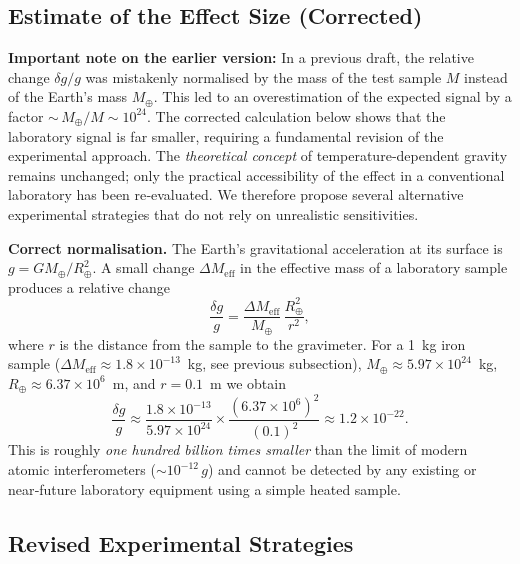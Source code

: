 \documentclass[12pt]{article}
\theoremstyle{remark}
\begin{document}
	\subsection{Estimate of the Effect Size (Corrected)}
	\label{subsec:lab-estimate-corrected}
	
	\textbf{Important note on the earlier version:} In a previous draft, the relative change
	$\delta g/g$ was mistakenly normalised by the mass of the test sample $M$ instead of the
	Earth's mass $M_\oplus$.  This led to an overestimation of the expected signal by a factor
	${\sim}\, M_\oplus/M \sim 10^{24}$.  The corrected calculation below shows that the
	laboratory signal is far smaller, requiring a fundamental revision of the experimental
	approach.  The \emph{theoretical concept} of temperature‑dependent gravity remains unchanged;
	only the practical accessibility of the effect in a conventional laboratory has been
	re‑evaluated.  We therefore propose several alternative experimental strategies that do not
	rely on unrealistic sensitivities.
	
	\textbf{Correct normalisation.}  The Earth's gravitational acceleration at its surface is
	$g = G M_\oplus / R_\oplus^2$.  A small change $\Delta M_{\mathrm{eff}}$ in the effective
	mass of a laboratory sample produces a relative change
	\begin{equation}
		\frac{\delta g}{g} = \frac{\Delta M_{\mathrm{eff}}}{M_\oplus}\,
		\frac{R_\oplus^2}{r^2},
		\label{eq:delta-g-correct}
	\end{equation}
	where $r$ is the distance from the sample to the gravimeter.  For a 1~kg iron sample
	($\Delta M_{\mathrm{eff}} \approx 1.8\times10^{-13}$~kg, see previous subsection),
	$M_\oplus \approx 5.97\times10^{24}$~kg, $R_\oplus \approx 6.37\times10^{6}$~m, and
	$r = 0.1$~m we obtain
	\[
	\frac{\delta g}{g} \approx
	\frac{1.8\times10^{-13}}{5.97\times10^{24}} \times
	\frac{(6.37\times10^{6})^2}{(0.1)^2}
	\approx 1.2\times10^{-22}.
	\]
	This is roughly \emph{one hundred billion times smaller} than the limit of modern atomic
	interferometers ($\sim 10^{-12}\,g$) and cannot be detected by any existing or near‑future
	laboratory equipment using a simple heated sample.
	
	\subsection{Revised Experimental Strategies}
	\label{subsec:lab-revised}
	
\end{document}

